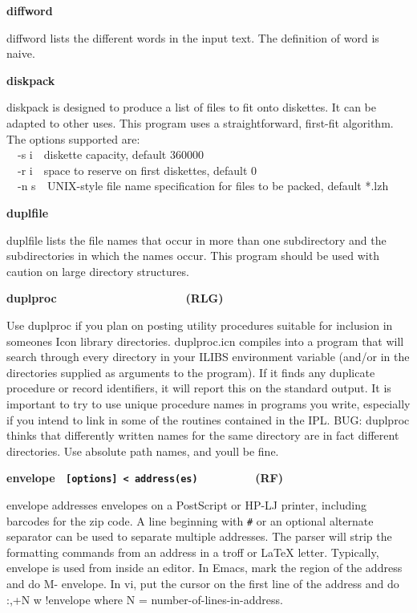 {{\sffamily\bfseries
diffword\ \ \ \ \ \ \ \ \ \ \ \ \ \ \ \ \ \ \ \ }

\textsf{diffword} lists the different words in the input text. The
definition of {\textquotedbl}word{\textquotedbl} is naive. 

{\sffamily\bfseries
diskpack\ \ \ \ \ \ \ \ \ \ \ \ \ \ \ \ \ \ \ \ }

\textsf{diskpack} is designed to produce a list of files to fit onto
diskettes. It can be adapted to other uses. This
program uses a straightforward, first-fit algorithm. The options
supported are:\\
\ \ \textsf{{}-s i}\ \ diskette capacity, default 360000\\
\ \ \textsf{{}-r i}\ \ space to reserve on first diskettes, default
0\\
\ \ \textsf{{}-n s}\texttt{\ \ }UNIX-style file name specification for
files to be packed, default {\textquotedbl}*.lzh{\textquotedbl}

{\sffamily\bfseries
duplfile\ \ \ \ \ \ \ \ \ \ \ \ \ \ \ \ \ \ \ \ }

\textsf{duplfile} lists the file names that occur in more than one
subdirectory and the subdirectories in which the names occur. This
program should be used with caution on large directory structures.

{\sffamily\bfseries
duplproc\ \ \ \ \ \ \ \ \ \ \ \ \ \ \ \ \ \ \ \ (RLG)}

Use \textsf{duplproc} if you plan on posting utility procedures suitable
for inclusion in someone{\textquotesingle}s Icon library directories.
duplproc.icn compiles into a program that will search through every
directory in your ILIBS environment
variable (and/or in the directories supplied as arguments to the
program). If it finds any duplicate procedure or record identifiers, it
will report this on the standard output. It is important to try to use
unique procedure names in programs you write, especially if you intend
to link in some of the routines contained in the IPL. BUG: duplproc
thinks that differently written names for the same directory are in
fact different directories. Use absolute path names, and
you{\textquotesingle}ll be fine.

{\sffamily\bfseries
envelope \ \texttt{\textmd{[options] {\textless}
address(es)\ \ \ \ \ \ \ \ \ \  }}(RF)}

\textsf{envelope} addresses envelopes on a PostScript
or HP-LJ printer, including barcodes for the zip code. A line beginning
with \texttt{\#} or an optional alternate separator can be used to
separate multiple addresses. The parser will strip the formatting
commands from an address in a troff or LaTeX letter. Typically,
\textsf{envelope} is used from inside an editor. In
Emacs, mark the region of the address and do \textsf{M-{\textbar}
envelope}. In vi, put the cursor on the first line of the address and
do \textsf{:,+N w !envelope} where N = number-of-lines-in-address.

}

